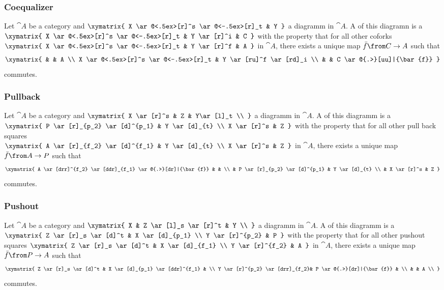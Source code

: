 \documentclass{beamer}
\begin{document}
\begin{frame}
  \frametitle{Coequalizer}

  Let $\cat{A}$ be a category and
  $ \xymatrix{
    X \ar@<.5ex>[r]^s \ar@<-.5ex>[r]_t & Y
  } $
  a diagramm in $\cat{A}$.
  A  of this diagramn is a  \\
  $ \xymatrix{
    X \ar@<.5ex>[r]^s \ar@<-.5ex>[r]_t & Y \ar[r]^i & C
  } $
  with the property that for all other coforks
  $ \xymatrix{
    X \ar@<.5ex>[r]^s \ar@<-.5ex>[r]_t & Y \ar[r]^f & A
  } $
  in $\cat{A}$, there exists a unique map $\bar{f}\from C \to A$ such that
  \[ \xymatrix{
    & & A  \\
    X \ar@<.5ex>[r]^s \ar@<-.5ex>[r]_t & Y \ar[ru]^f \ar[rd]_i \\
    & & C \ar@{.>}[uu]|{\bar{f}}
  } \]
  commutes.
\end{frame}

\begin{frame}
  \frametitle{Pullback}

  Let $\cat{A}$ be a category and
  $ \xymatrix{
    X \ar[r]^s & Z & Y\ar[l]_t \\
  } $
  a diagramm in $\cat{A}$.
  A  of this diagramm is a  \\
  $ \xymatrix{
    P \ar[r]_{p_2} \ar[d]^{p_1} & Y \ar[d]_{t} \\
    X \ar[r]^s & Z
  } $
  with the property that for all other pull back squares \\
  $ \xymatrix{
    A \ar[r]_{f_2} \ar[d]^{f_1} & Y \ar[d]_{t} \\
    X \ar[r]^s & Z
  } $
  in $\cat{A}$, there exists a unique map $\bar{f}\from A \to P$ such that
  \[ \xymatrix{
    A \ar[drr]^{f_2} \ar[ddr]_{f_1} \ar@{.>}[dr]|{\bar{f}} & & \\
    & P \ar[r]_{p_2} \ar[d]^{p_1} & Y \ar[d]_{t} \\
    & X \ar[r]^s & Z
  } \]
  commutes.
\end{frame}

\begin{frame}
  \frametitle{Pushout}

  Let $\cat{A}$ be a category and
  $ \xymatrix{
    X & Z \ar[l]_s \ar[r]^t & Y \\
  } $
  a diagramm in $\cat{A}$.
  A  of this diagramm is a  \\
  $ \xymatrix{
    Z \ar[r]_s \ar[d]^t & X \ar[d]_{p_1} \\
    Y \ar[r]^{p_2} & P
  } $
  with the property that for all other pushout squares
  $ \xymatrix{
    Z \ar[r]_s \ar[d]^t & X \ar[d]_{f_1} \\
    Y \ar[r]^{f_2} & A
  } $
  in $\cat{A}$, there exists a unique map $\bar{f}\from P \to A$ such that
  \[ \xymatrix{
    Z \ar[r]_s \ar[d]^t & X \ar[d]_{p_1} \ar[ddr]^{f_1} & \\
    Y \ar[r]^{p_2} \ar[drr]_{f_2}& P \ar@{.>}[dr]|{\bar{f}} & \\
    & & A  \\
  } \]
  commutes.
\end{frame}
\end{document}
